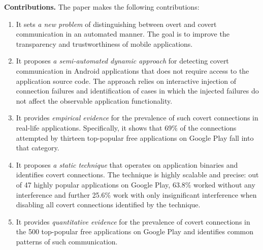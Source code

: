 
\noindent 
{\bf Contributions.}
The paper makes the following contributions:

\vspace{-0.05in}
\begin{enumerate}[leftmargin=0.5cm]\setlength{\itemsep}{-0.01in}

\item It sets \emph{a new problem} of distinguishing between overt and covert communication in an automated manner. 
The goal is to improve the
transparency and trustworthiness of mobile applications.


\item It proposes \emph{a semi-automated dynamic approach} for detecting covert communication in Android applications that does not require access to the application source code. 
The approach relies on interactive injection of connection failures
and identification of cases in which the injected failures do not
affect the observable application functionality.

\item It provides \emph{empirical evidence} for the prevalence of such covert connections in real-life applications. Specifically, it shows that 69\% of the connections attempted by thirteen top-popular free applications on Google Play fall into that category.    

\item It proposes \emph{a static technique} that operates on
application binaries and identifies covert connections. 
The
technique is highly scalable and precise: out of 47 highly popular
applications on Google Play, 63.8\% worked without any interference
and further 25.6\% work with only insignificant interference when
disabling all covert connections identified by the technique.


\item It provides \emph{quantitative evidence} for the prevalence of covert connections in the 500 top-popular free applications on Google Play and identifies common patterns of such communication. 


\end{enumerate}

